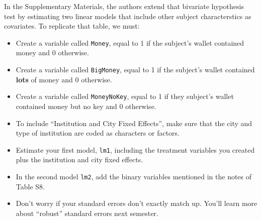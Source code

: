 \documentclass[12pt,halfline,a4paper,]{ouparticle}
\providecommand{\tightlist}{%
  \setlength{\itemsep}{0pt}\setlength{\parskip}{0pt}}
\begin{document}
In the Supplementary Materials, the authors extend that bivariate
hypothesis test by estimating two linear models that include other
subject characterstics as covariates. To replicate that table, we must:

\begin{itemize}
\tightlist
\item
  Create a variable called \texttt{Money}, equal to 1 if the subject's
  wallet contained money and 0 otherwise.
\item
  Create a variable called \texttt{BigMoney}, equal to 1 if the
  subject's wallet contained \textbf{lots} of money and 0 otherwise.
\item
  Create a variable called \texttt{MoneyNoKey}, equal to 1 if they
  subject's wallet contained money but no key and 0 otherwise.
\item
  To include ``Institution and City Fixed Effects'', make sure that the
  city and type of institution are coded as characters or factors.
\item
  Estimate your first model, \texttt{lm1}, including the treatment
  variables you created plus the institution and city fixed effects.
\item
  In the second model \texttt{lm2}, add the binary variables mentioned
  in the notes of Table S8.
\item
  Don't worry if your standard errors don't exactly match up. You'll
  learn more about ``robust'' standard errors next semester.
\end{itemize}
\end{document}
